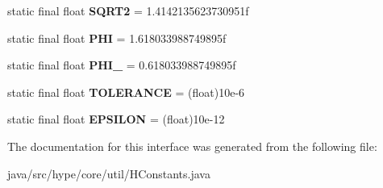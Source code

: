 \begin{DoxyCompactItemize}
\item 
\hypertarget{interfacehype_1_1core_1_1util_1_1_h_constants_a39c184dac11cef9f4b1ddc54f052e612}{static final float {\bfseries S\-Q\-R\-T2} = 1.\-4142135623730951f}\label{interfacehype_1_1core_1_1util_1_1_h_constants_a39c184dac11cef9f4b1ddc54f052e612}

\item 
\hypertarget{interfacehype_1_1core_1_1util_1_1_h_constants_ae05e0f9228654eda8d3fcb6e5b010fd9}{static final float {\bfseries P\-H\-I} = 1.\-618033988749895f}\label{interfacehype_1_1core_1_1util_1_1_h_constants_ae05e0f9228654eda8d3fcb6e5b010fd9}

\item 
\hypertarget{interfacehype_1_1core_1_1util_1_1_h_constants_a38004c29ec77f13033b3a5993a7d4818}{static final float {\bfseries P\-H\-I\-\_} = 0.\-618033988749895f}\label{interfacehype_1_1core_1_1util_1_1_h_constants_a38004c29ec77f13033b3a5993a7d4818}

\item 
\hypertarget{interfacehype_1_1core_1_1util_1_1_h_constants_ac385cb8b9b7903b151f1c4c94e66fa44}{static final float {\bfseries T\-O\-L\-E\-R\-A\-N\-C\-E} = (float)10e-\/6}\label{interfacehype_1_1core_1_1util_1_1_h_constants_ac385cb8b9b7903b151f1c4c94e66fa44}

\item 
\hypertarget{interfacehype_1_1core_1_1util_1_1_h_constants_af58dd23b7edb42a36cd6cae38a7174bf}{static final float {\bfseries E\-P\-S\-I\-L\-O\-N} = (float)10e-\/12}\label{interfacehype_1_1core_1_1util_1_1_h_constants_af58dd23b7edb42a36cd6cae38a7174bf}

\end{DoxyCompactItemize}


The documentation for this interface was generated from the following file\-:\begin{DoxyCompactItemize}
\item 
java/src/hype/core/util/H\-Constants.\-java\end{DoxyCompactItemize}
